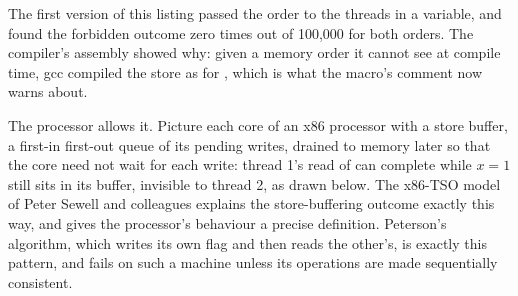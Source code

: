 \label{lst:b3:concurrency:litmus}

\label{out:b3:concurrency:litmus}

The first version of this listing passed the order to the threads in a variable, and found the forbidden outcome zero times out of 100,000 for both orders. The compiler's assembly showed why: given a memory order it cannot see at compile time, gcc compiled the store as for , which is what the macro's comment now warns about.

The processor allows it. Picture each core of an x86 processor with a store buffer, a first-in first-out queue of its pending writes, drained to memory later so that the core need not wait for each write: thread 1's read of  can complete while $x = 1$ still sits in its buffer, invisible to thread 2, as drawn below. The x86-TSO model of Peter Sewell and colleagues explains the store-buffering outcome exactly this way, %
and gives the processor's behaviour a precise definition. %
Peterson's algorithm, which writes its own flag and then reads the other's, is exactly this pattern, and fails on such a machine unless its operations are made sequentially consistent.

